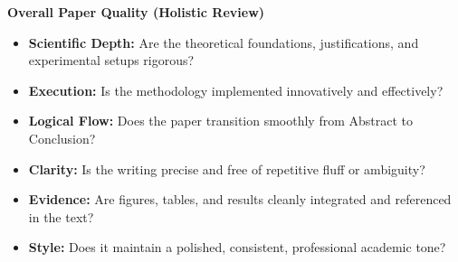 \vspace{1em}
\noindent\textbf{Overall Paper Quality (Holistic Review)}
\vspace{0.5em}
\begin{itemize}
    \item \textbf{Scientific Depth:} Are the theoretical foundations, justifications, and experimental setups rigorous?
    \item \textbf{Execution:} Is the methodology implemented innovatively and effectively?
    \item \textbf{Logical Flow:} Does the paper transition smoothly from Abstract to Conclusion?
    \item \textbf{Clarity:} Is the writing precise and free of repetitive fluff or ambiguity?
    \item \textbf{Evidence:} Are figures, tables, and results cleanly integrated and referenced in the text?
    \item \textbf{Style:} Does it maintain a polished, consistent, professional academic tone?
\end{itemize}
